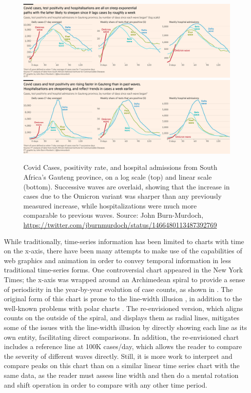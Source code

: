\documentclass[article]{jdssv}\usepackage[]{graphicx}\usepackage[]{color}
\begin{document}
\begin{figure}\centering
\includegraphics[width=\linewidth]{ft-waves}\\
\includegraphics[width=\linewidth]{ft-waves-linear}
\caption{Covid Cases, positivity rate, and hospital admissions from South Africa's Gauteng province, on a log scale (top) and linear scale (bottom). Successive waves are overlaid, showing that the increase in cases due to the Omicron variant was sharper than any previously measured increase, while hospitalizations were much more comparable to previous waves. Source: John Burn-Murdoch, \url{https://twitter.com/jburnmurdoch/status/1466480113487392769}}
\label{fig:ft-waves}
\end{figure}


While traditionally, time-series information has been limited to charts with time on the x-axis, there have been many attempts to make use of the capabilities of web graphics and animation in order to convey temporal information in less traditional time-series forms. One controversial chart appeared in the New York Times; the x-axis was wrapped around an Archimedean spiral to provide a sense of periodicity in the year-by-year evolution of case counts, as shown in . The original form of this chart is prone to the line-width illusion \citep{vanderplasSignsSineIllusion2015}, in addition to the well-known problems with polar charts \citep{hofmannGraphicalTestsPower2012,waldnerComparisonRadialLinear2020}. The re-envisioned version, which aligns counts on the outside of the spiral, and displays them as radial lines, mitigates some of the issues with the line-width illusion by directly showing each line as its own entity, facilitating direct comparisons. In addition, the re-envisioned chart includes a reference line at 100K cases/day, which allows the reader to compare the severity of different waves directly. Still, it is more work to interpret and compare peaks on this chart than on a similar linear time series chart with the same data, as the reader must assess line width and then do a mental rotation and shift operation in order to compare with any other time period.
\end{document}
